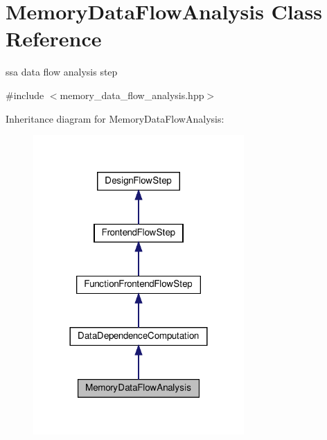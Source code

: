 \hypertarget{classMemoryDataFlowAnalysis}{}\section{Memory\+Data\+Flow\+Analysis Class Reference}
\label{classMemoryDataFlowAnalysis}


ssa data flow analysis step  




{\ttfamily \#include $<$memory\+\_\+data\+\_\+flow\+\_\+analysis.\+hpp$>$}



Inheritance diagram for Memory\+Data\+Flow\+Analysis\+:
\nopagebreak
\begin{figure}[H]
\begin{center}
\leavevmode
\includegraphics[width=228pt]{da/d0b/classMemoryDataFlowAnalysis__inherit__graph}
\end{center}
\end{figure}


